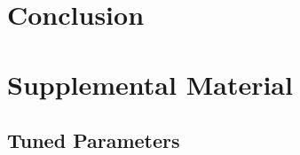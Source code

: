 \documentclass{article}
\renewcommand{\_}[1]{\underline{ #1 }}
\theoremstyle{definition}
\begin{document}
\section[Conclusion]{Conclusion}
\label{Conclusion}


\cleardoublepage
\ifdefined{}
\else
\fi

% 
\nocite{*} %
\printbibliography

\pagebreak


\section[Supplemental Material]{Supplemental Material}
\label{Supplemental Material}

\subsection[Code Parameters]{Tuned Parameters}
\label{Code Parameters}
\end{document}
